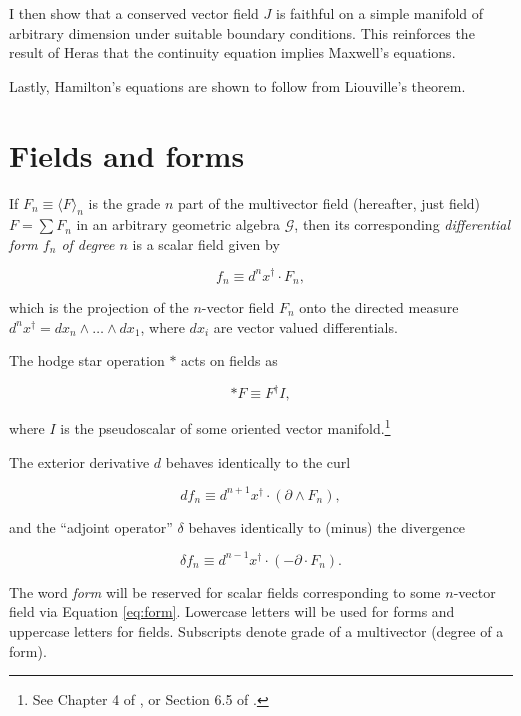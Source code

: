 \documentclass{article}
\begin{document}
I then show that a conserved vector field $J$ is faithful on a simple manifold of arbitrary dimension under suitable boundary conditions. This reinforces the result of Heras that the continuity equation implies Maxwell's equations.

Lastly, Hamilton's equations are shown to follow from Liouville's theorem.

\section{Fields and forms} If $F_n \equiv \langle F \rangle_n$ is the grade $n$ part of the multivector field (hereafter, just field) $F = \sum F_n$ in an arbitrary geometric algebra $\mathcal{G}$, then its corresponding \emph{differential form $f_n$ of degree $n$} is a scalar field given by \cite{cagc}

\begin{equation}
  f_n \equiv d^nx^\dagger \cdot F_n,\label{eq:form}
\end{equation}

which is the projection of the $n$-vector field $F_n$ onto the directed measure $d^nx^\dagger = dx_n \wedge \dots \wedge dx_1$, where $dx_i$ are vector valued differentials. 

The hodge star operation $*$ acts on fields as

\begin{equation}
  *F \equiv F^\dagger I,\label{eq:hodge}
\end{equation}

where $I$ is the pseudoscalar of some oriented vector manifold.\footnote{See Chapter 4 of \cite{cagc}, or Section 6.5 of \cite{gap}.}

The exterior derivative $d$ behaves identically to the curl

\begin{equation}
  d f_n \equiv d^{n+1}x^\dagger \cdot (\partial \wedge F_n),\label{eq:curl}
\end{equation}

and the ``adjoint operator'' $\delta$ behaves identically to (minus) the divergence

\begin{equation}
  \delta f_n \equiv d^{n-1}x^\dagger \cdot (-\partial \cdot F_n).\label{eq:divergence}
\end{equation} 

The word \emph{form} will be reserved for scalar fields corresponding to some $n$-vector field via Equation \ref{eq:form}. Lowercase letters will be used for forms and uppercase letters for fields. Subscripts denote grade of a multivector (degree of a form).
\end{document}
